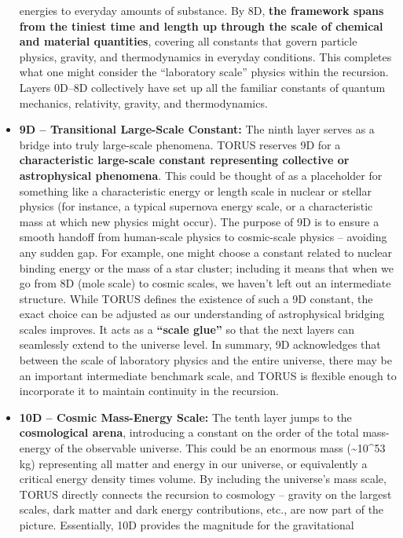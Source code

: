\documentclass[
]{article}
\begin{document}
\begin{itemize}
  energies to everyday amounts of substance. By 8D, \textbf{the
  framework spans from the tiniest time and length up through the scale
  of chemical and material quantities}, covering all constants that
  govern particle physics, gravity, and thermodynamics in everyday
  conditions. This completes what one might consider the ``laboratory
  scale'' physics within the recursion. Layers 0D--8D collectively have
  set up all the familiar constants of quantum mechanics, relativity,
  gravity, and thermodynamics.
\item
  \textbf{9D -- Transitional Large-Scale Constant:} The ninth layer
  serves as a bridge into truly large-scale phenomena. TORUS reserves 9D
  for a \textbf{characteristic large-scale constant representing
  collective or astrophysical phenomena}. This could be thought of as a
  placeholder for something like a characteristic energy or length scale
  in nuclear or stellar physics (for instance, a typical supernova
  energy scale, or a characteristic mass at which new physics might
  occur). The purpose of 9D is to ensure a smooth handoff from
  human-scale physics to cosmic-scale physics -- avoiding any sudden
  gap. For example, one might choose a constant related to nuclear
  binding energy or the mass of a star cluster; including it means that
  when we go from 8D (mole scale) to cosmic scales, we haven't left out
  an intermediate structure. While TORUS defines the existence of such a
  9D constant, the exact choice can be adjusted as our understanding of
  astrophysical bridging scales improves. It acts as a \textbf{``scale
  glue''} so that the next layers can seamlessly extend to the universe
  level. In summary, 9D acknowledges that between the scale of
  laboratory physics and the entire universe, there may be an important
  intermediate benchmark scale, and TORUS is flexible enough to
  incorporate it to maintain continuity in the recursion.
\item
  \textbf{10D -- Cosmic Mass-Energy Scale:} The tenth layer jumps to the
  \textbf{cosmological arena}, introducing a constant on the order of
  the total mass-energy of the observable universe. This could be an
  enormous mass (\textasciitilde10\^{}53 kg) representing all matter and
  energy in our universe, or equivalently a critical energy density
  times volume. By including the universe's mass scale, TORUS directly
  connects the recursion to cosmology -- gravity on the largest scales,
  dark matter and dark energy contributions, etc., are now part of the
  picture. Essentially, 10D provides the magnitude for the gravitational

\end{itemize}
\end{document}
